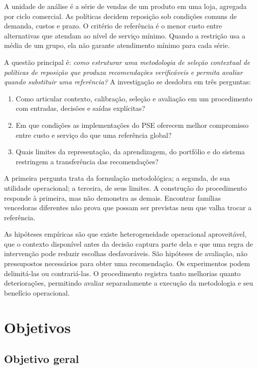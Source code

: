 A unidade de análise é a série de vendas de um produto em uma loja, agregada por ciclo comercial. As políticas decidem reposição sob condições comuns de demanda, custos e prazo. O critério de referência é o menor custo entre alternativas que atendam ao nível de serviço mínimo. Quando a restrição usa a média de um grupo, ela não garante atendimento mínimo para cada série.

A questão principal é: \emph{como estruturar uma metodologia de seleção contextual de políticas de reposição que produza recomendações verificáveis e permita avaliar quando substituir uma referência?} A investigação se desdobra em três perguntas:

\begin{enumerate}
  \item Como articular contexto, calibração, seleção e avaliação em um procedimento com entradas, decisões e saídas explícitas?
  \item Em que condições as implementações do PSE oferecem melhor compromisso entre custo e serviço do que uma referência global?
  \item Quais limites da representação, da aprendizagem, do portfólio e do sistema restringem a transferência das recomendações?
\end{enumerate}

A primeira pergunta trata da formulação metodológica; a segunda, de sua utilidade operacional; a terceira, de seus limites. A construção do procedimento responde à primeira, mas não demonstra as demais. Encontrar famílias vencedoras diferentes não prova que possam ser previstas nem que valha trocar a referência.

As hipóteses empíricas são que existe heterogeneidade operacional aproveitável, que o contexto disponível antes da decisão captura parte dela e que uma regra de intervenção pode reduzir escolhas desfavoráveis. São hipóteses de avaliação, não pressupostos necessários para obter uma recomendação. Os experimentos podem delimitá-las ou contrariá-las. O procedimento registra tanto melhorias quanto deteriorações, permitindo avaliar separadamente a execução da metodologia e seu benefício operacional.

\section{Objetivos}

\subsection*{Objetivo geral}

